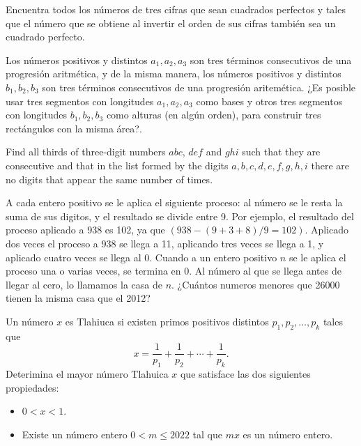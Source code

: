 \documentclass[11pt]{scrartcl}
\newcommand{\thmdifficulty}{0}
\newcommand{\problemdiff}[1]{\renewcommand{\thmdifficulty}{#1}}
\begin{document}
\problemdiff{2}
\begin{problem}
    Encuentra todos los números de tres cifras que sean cuadrados perfectos y tales que
el número que se obtiene al invertir el orden de sus cifras también sea un cuadrado
perfecto.
\end{problem}


\problemdiff{3}
\begin{problem}
Los números positivos y distintos $a_1,a_2,a_3$ son tres términos consecutivos de una progresión aritmética, y de la misma manera, los números positivos y distintos $b_1,b_2,b_3$ son tres términos consecutivos de una progresión aritemética. ¿Es posible usar tres segmentos con longitudes $a_1,a_2,a_3$ como bases y otros tres segmentos con longitudes $b_1,b_2,b_3$ como alturas (en algún orden), para construir tres rectángulos con la misma área?.
\end{problem}


\problemdiff{3}

\begin{problem} %
    Find all thirds of three-digit numbers $abc$, $def$ and $ghi$ such that they are consecutive and that in the list formed by the digits $a, b, c, d, e, f, g, h, i$ there are no digits that appear the same number of times.
\end{problem}


\problemdiff{3}

\begin{problem}
A cada entero positivo se le aplica el siguiente proceso: al número se le resta la suma de sus digitos, y el resultado se divide entre 9. Por ejemplo, el resultado del proceso aplicado a 938 es 102, ya que $(938-(9+3+8)/9=102)$. Aplicado dos veces el proceso a 938 se llega a 11, aplicando tres veces se llega a 1, y aplicado cuatro veces se llega al 0. Cuando a un entero positivo $n$ se le aplica el proceso una o varias veces, se termina en 0. Al número al que se llega antes de llegar al cero, lo llamamos la casa de $n$. ¿Cuántos numeros menores que 26000 tienen la misma casa que el 2012?
\end{problem}



\problemdiff{3.5}
\begin{problem}
    Un número $x$ es Tlahiuca si existen primos positivos distintos $p_1,p_2,\dots,p_k$ tales que 
\[x=\frac{1}{p_1}+\frac{1}{p_2}+\cdots+\frac{1}{p_k}.\]
Deterimina el mayor número Tlahuica $x$ que satisface las dos siguientes propiedades:
 \begin{itemize} 
 \item  $0< x < 1$. 
 \item  Existe un número entero $0< m\leq 2022$ tal que $mx$ es un número entero. 
 \end{itemize} 
\end{problem}
\end{document}

